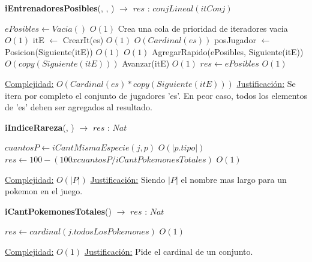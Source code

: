 \begin{algorithm}[H]{\textbf{iEntrenadoresPosibles}(, , )  $\to$ $res$ : $conjLineal(itConj)$} 
	{}
	\begin{algorithmic}
		\State $ePosibles \gets Vacia() $ \Comment $O(1)$ {Crea una cola de prioridad de iteradores vacia}
			\Comment $O(1)$
			\State itE $\gets$ CrearIt(es)	\Comment $O(1)$
			 \Comment $O(Cardinal(es))$
				\State posJugador $\gets$ Posicion(Siguiente(itE))	\Comment $O(1)$
				 \Comment $O(1)$
					\State AgregarRapido(ePosibles, Siguiente(itE))	\Comment $O(copy(Siguiente(itE)))$
				\EndIf
				\State Avanzar(itE)	\Comment $O(1)$
			\EndWhile
		\EndIf
		\State $res \gets ePosibles$ \Comment $O(1)$
	
		\medskip
		\Statex \underline{Complejidad:} $O(Cardinal(es) * copy(Siguiente(itE)))$
		\Statex \underline{Justificación:} Se itera por completo el conjunto de jugadores 'es'. En peor caso, todos los elementos de 'es' deben ser agregados al resultado.
    \end{algorithmic}
\end{algorithm}

\begin{algorithm}[H]{\textbf{iIndiceRareza}(, )  $\to$ $res$ : $Nat$} 
	{}
	\begin{algorithmic}
		\State $cuantosP \gets iCantMismaEspecie(j, p) $ \Comment $O(|p.tipo|)$
		\State $res \gets 100 - (100 x cuantosP / iCantPokemonesTotales) $ \Comment $O(1)$
	
		\medskip
		\Statex \underline{Complejidad:} $O(|P|)$
		\Statex \underline{Justificación:} Siendo $|P|$ el nombre mas largo para un pokemon en el juego.
    \end{algorithmic}
\end{algorithm}

\begin{algorithm}[H]{\textbf{iCantPokemonesTotales}() $\to$ $res$ : $Nat$} 
	{}
	\begin{algorithmic}
		\State $res \gets cardinal(j.todosLosPokemones) $ \Comment $O(1)$
	
		\medskip
		\Statex \underline{Complejidad:} $O(1)$
		\Statex \underline{Justificación:} Pide el cardinal de un conjunto.
    \end{algorithmic}
\end{algorithm}

